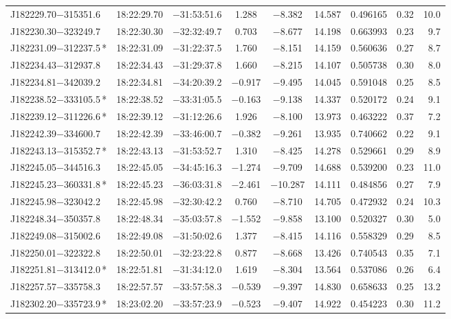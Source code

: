 \begin{table*}
\begin{tabular}{lcccccccr}
J182229.70$-$315351.6 & 18:22:29.70 & $-$31:53:51.6 &  1.288 & $-$8.382 & 14.587 & 0.496165 & 0.32 & 10.0 \\
J182230.30$-$323249.7 & 18:22:30.30 & $-$32:32:49.7 &  0.703 & $-$8.677 & 14.198 & 0.663993 & 0.23 & 9.7 \\
J182231.09$-$312237.5\,* & 18:22:31.09 & $-$31:22:37.5 &  1.760 & $-$8.151 & 14.159 & 0.560636 & 0.27 & 8.7 \\
J182234.43$-$312937.8 & 18:22:34.43 & $-$31:29:37.8 &  1.660 & $-$8.215 & 14.107 & 0.505738 & 0.30 & 8.0 \\
J182234.81$-$342039.2 & 18:22:34.81 & $-$34:20:39.2 & $-$0.917 & $-$9.495 & 14.045 & 0.591048 & 0.25 & 8.5 \\
J182238.52$-$333105.5\,* & 18:22:38.52 & $-$33:31:05.5 & $-$0.163 & $-$9.138 & 14.337 & 0.520172 & 0.24 & 9.1 \\
J182239.12$-$311226.6\,* & 18:22:39.12 & $-$31:12:26.6 &  1.926 & $-$8.100 & 13.973 & 0.463222 & 0.37 & 7.2 \\
J182242.39$-$334600.7 & 18:22:42.39 & $-$33:46:00.7 & $-$0.382 & $-$9.261 & 13.935 & 0.740662 & 0.22 & 9.1 \\
J182243.13$-$315352.7\,* & 18:22:43.13 & $-$31:53:52.7 &  1.310 & $-$8.425 & 14.278 & 0.529661 & 0.29 & 8.9 \\
J182245.05$-$344516.3 & 18:22:45.05 & $-$34:45:16.3 & $-$1.274 & $-$9.709 & 14.688 & 0.539200 & 0.23 & 11.0 \\
J182245.23$-$360331.8\,* & 18:22:45.23 & $-$36:03:31.8 & $-$2.461 & $-$10.287 & 14.111 & 0.484856 & 0.27 & 7.9 \\
J182245.98$-$323042.2 & 18:22:45.98 & $-$32:30:42.2 &  0.760 & $-$8.710 & 14.705 & 0.472932 & 0.24 & 10.3 \\
J182248.34$-$350357.8 & 18:22:48.34 & $-$35:03:57.8 & $-$1.552 & $-$9.858 & 13.100 & 0.520327 & 0.30 & 5.0 \\
J182249.08$-$315002.6 & 18:22:49.08 & $-$31:50:02.6 &  1.377 & $-$8.415 & 14.116 & 0.558329 & 0.29 & 8.5 \\
J182250.01$-$322322.8 & 18:22:50.01 & $-$32:23:22.8 &  0.877 & $-$8.668 & 13.426 & 0.740543 & 0.35 & 7.1 \\
J182251.81$-$313412.0\,* & 18:22:51.81 & $-$31:34:12.0 &  1.619 & $-$8.304 & 13.564 & 0.537086 & 0.26 & 6.4 \\
J182257.57$-$335758.3 & 18:22:57.57 & $-$33:57:58.3 & $-$0.539 & $-$9.397 & 14.830 & 0.658633 & 0.25 & 13.2 \\
J182302.20$-$335723.9\,* & 18:23:02.20 & $-$33:57:23.9 & $-$0.523 & $-$9.407 & 14.922 & 0.454223 & 0.30 & 11.2 \\

\end{tabular}
\end{table*}
